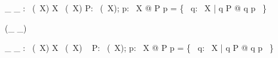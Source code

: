 \begin{gendef}[X]
    \_ \dsetminus \_ : \power~(\power~X) \cross \power X \fun \power~(\power~X)           
\where
    \forall P: \power~(\power~X); p: \power~X @ P \dsetminus p = \{~ q: \power~X | q \in P @ q \setminus p ~\}
\end{gendef}

\begin{zed}
     \leftassoc (\_ \dcap \_)
\end{zed}

\begin{gendef}[X]
    \_ \dcap \_ : \power~(\power~X) \cross \power X \fun \power~(\power~X)
\where
    \forall~ P: \power~(\power~X); p: \power~X @ P \dcap p = \{~ q: \power~X | q \in P @ q \cap p ~\}
\end{gendef}
